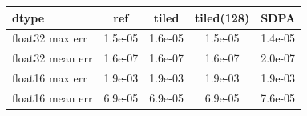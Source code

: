 \begin{tabular}{lcccc}\toprule dtype & ref & tiled & tiled(128) & SDPA\\\midrule
float32 max err & 1.5e-05 & 1.6e-05 & 1.5e-05 & 1.4e-05\\
float32 mean err & 1.6e-07 & 1.6e-07 & 1.6e-07 & 2.0e-07\\
float16 max err & 1.9e-03 & 1.9e-03 & 1.9e-03 & 1.9e-03\\
float16 mean err & 6.9e-05 & 6.9e-05 & 6.9e-05 & 7.6e-05\\
\bottomrule\end{tabular}